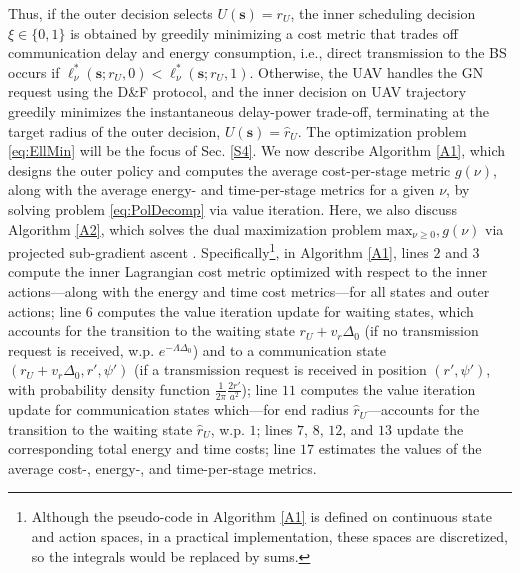 \documentclass[12pt, draftcls, onecolumn]{IEEEtran}
\theoremstyle{plain}
\theoremstyle{definition}
\theoremstyle{remark}
\begin{document}
\noindent Thus, if the outer decision selects $U(\mathbf{s}){=}r_{U}$, the inner scheduling decision $\xi{\in}\{0,1\}$ is obtained by greedily minimizing 
a cost metric that trades off communication delay and energy consumption, i.e., direct transmission to the BS occurs if $\ell_{\nu}^{*}(\mathbf{s}; r_{U},0){<}\ell_{\nu}^{*}(\mathbf{s};r_{U},1)$. Otherwise, the UAV handles the GN request using the D\&F protocol, and the inner decision on UAV trajectory greedily minimizes the instantaneous delay-power trade-off, terminating at the target radius of the outer decision, $U(\mathbf{s}){=}\hat{r}_{U}$. The optimization problem \eqref{eq:EllMin} will be the focus of Sec. \ref{S4}. We now describe Algorithm \ref{A1}, which designs the outer policy and computes the average cost-per-stage metric $g(\nu)$, along with the average energy- and time-per-stage metrics for a given $\nu$, by solving problem \eqref{eq:PolDecomp} via value iteration. Here, we also discuss Algorithm \ref{A2}, which solves the dual maximization problem $\mathrm{max}_{\nu{\geq}0},g(\nu)$ via projected sub-gradient ascent \cite{SubgradientMethods}. 
Specifically\footnote{Although the pseudo-code in Algorithm \ref{A1} is defined on continuous state and action spaces, in a practical implementation, these spaces are discretized, so the integrals would be replaced by sums.}, in Algorithm \ref{A1}, lines $2$ and $3$ compute the inner Lagrangian cost metric optimized with respect to the inner actions---along with the energy and time cost metrics---for all states and outer actions; line $6$ computes the value iteration update for waiting states, which accounts for the transition to the waiting state $r_{U}{+}v_{r}\Delta_{0}$ (if no transmission request is received, w.p. $e^{-\Lambda\Delta_{0}}$) and to a communication state $(r_{U}{+}v_{r}\Delta_{0},r',\psi')$ (if a transmission request is received in position $(r',\psi')$, with probability density function $\frac{1}{2\pi}\frac{2r'}{a^{2}}$); line $11$ computes the value iteration update for communication states which---for end radius $\hat{r}_{U}$---accounts for the transition to the waiting state $\hat{r}_{U}$, w.p. $1$; lines $7$, $8$, $12$, and $13$ update the corresponding total energy and time costs; line $17$ estimates the values of the average cost-, energy-, and time-per-stage metrics.
\end{document}
